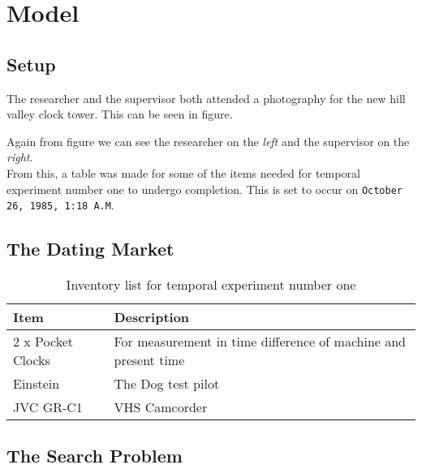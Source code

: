 \section{Model}
\label{sec: figs tables algos}
\subsection{Setup} 
The researcher and the supervisor both attended a photography for the new hill valley clock tower. This can be seen in figure.

\noindent Again from figure we can see the researcher on the \textit{left} and the supervisor on the \textit{right}.\\

From this, a table was made for some of the items needed for temporal experiment number one to undergo completion. This is set to occur on \texttt{October 26, 1985, 1:18 A.M}.
\subsection{The Dating Market}
\begin{table}[H] 
\begin{tabularx}{\textwidth}{| X | X |}
    \hline
     Item & Description  \\ \hline
     2 x Pocket Clocks & For measurement in time difference of machine and present time \\ \hline
     Einstein & The Dog test pilot \\ \hline
     JVC GR-C1 & VHS Camcorder \\ \hline
\end{tabularx}
\caption{Inventory list for temporal experiment number one}
\label{table: inventory}
\subsection{The Search Problem}

\end{table}
